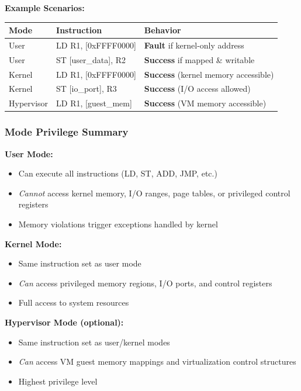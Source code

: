 \documentclass[12pt]{article}
\begin{document}
\textbf{Example Scenarios:}

\begin{table}[h]
\centering
\begin{tabular}{@{}lll@{}}
\toprule
\textbf{Mode} & \textbf{Instruction} & \textbf{Behavior} \\ \midrule
User & LD R1, [0xFFFF0000] & \textbf{Fault} if kernel-only address \\
User & ST [user\_data], R2 & \textbf{Success} if mapped \& writable \\
Kernel & LD R1, [0xFFFF0000] & \textbf{Success} (kernel memory accessible) \\
Kernel & ST [io\_port], R3 & \textbf{Success} (I/O access allowed) \\
Hypervisor & LD R1, [guest\_mem] & \textbf{Success} (VM memory accessible) \\ \bottomrule
\end{tabular}
\end{table}

\subsubsection{Mode Privilege Summary}

\textbf{User Mode:}
\begin{itemize}
    \item Can execute all instructions (LD, ST, ADD, JMP, etc.)
    \item \textit{Cannot} access kernel memory, I/O ranges, page tables, or privileged control registers
    \item Memory violations trigger exceptions handled by kernel
\end{itemize}

\textbf{Kernel Mode:}
\begin{itemize}
    \item Same instruction set as user mode
    \item \textit{Can} access privileged memory regions, I/O ports, and control registers
    \item Full access to system resources
\end{itemize}

\textbf{Hypervisor Mode (optional):}
\begin{itemize}
    \item Same instruction set as user/kernel modes
    \item \textit{Can} access VM guest memory mappings and virtualization control structures
    \item Highest privilege level
\end{itemize}
\end{document}
